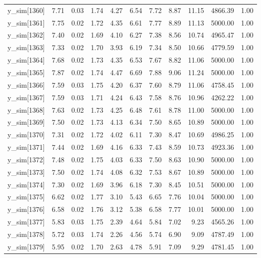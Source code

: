 \begin{table}[ht]
\begin{tabular}{rrrrrrrrrrr}
  y\_sim[1360] & 7.71 & 0.03 & 1.74 & 4.27 & 6.54 & 7.72 & 8.87 & 11.15 & 4866.39 & 1.00 \\ 
  y\_sim[1361] & 7.75 & 0.02 & 1.72 & 4.35 & 6.61 & 7.77 & 8.89 & 11.13 & 5000.00 & 1.00 \\ 
  y\_sim[1362] & 7.40 & 0.02 & 1.69 & 4.10 & 6.27 & 7.38 & 8.56 & 10.74 & 4965.47 & 1.00 \\ 
  y\_sim[1363] & 7.33 & 0.02 & 1.70 & 3.93 & 6.19 & 7.34 & 8.50 & 10.66 & 4779.59 & 1.00 \\ 
  y\_sim[1364] & 7.68 & 0.02 & 1.73 & 4.35 & 6.53 & 7.67 & 8.82 & 11.06 & 5000.00 & 1.00 \\ 
  y\_sim[1365] & 7.87 & 0.02 & 1.74 & 4.47 & 6.69 & 7.88 & 9.06 & 11.24 & 5000.00 & 1.00 \\ 
  y\_sim[1366] & 7.59 & 0.03 & 1.75 & 4.20 & 6.37 & 7.60 & 8.79 & 11.06 & 4758.45 & 1.00 \\ 
  y\_sim[1367] & 7.59 & 0.03 & 1.71 & 4.24 & 6.43 & 7.58 & 8.76 & 10.96 & 4262.22 & 1.00 \\ 
  y\_sim[1368] & 7.63 & 0.02 & 1.73 & 4.25 & 6.48 & 7.61 & 8.78 & 11.00 & 5000.00 & 1.00 \\ 
  y\_sim[1369] & 7.50 & 0.02 & 1.73 & 4.13 & 6.34 & 7.50 & 8.65 & 10.89 & 5000.00 & 1.00 \\ 
  y\_sim[1370] & 7.31 & 0.02 & 1.72 & 4.02 & 6.11 & 7.30 & 8.47 & 10.69 & 4986.25 & 1.00 \\ 
  y\_sim[1371] & 7.44 & 0.02 & 1.69 & 4.16 & 6.33 & 7.43 & 8.59 & 10.73 & 4923.36 & 1.00 \\ 
  y\_sim[1372] & 7.48 & 0.02 & 1.75 & 4.03 & 6.33 & 7.50 & 8.63 & 10.90 & 5000.00 & 1.00 \\ 
  y\_sim[1373] & 7.50 & 0.02 & 1.74 & 4.08 & 6.32 & 7.53 & 8.67 & 10.89 & 5000.00 & 1.00 \\ 
  y\_sim[1374] & 7.30 & 0.02 & 1.69 & 3.96 & 6.18 & 7.30 & 8.45 & 10.51 & 5000.00 & 1.00 \\ 
  y\_sim[1375] & 6.62 & 0.02 & 1.77 & 3.10 & 5.43 & 6.65 & 7.76 & 10.04 & 5000.00 & 1.00 \\ 
  y\_sim[1376] & 6.58 & 0.02 & 1.76 & 3.12 & 5.38 & 6.58 & 7.77 & 10.01 & 5000.00 & 1.00 \\ 
  y\_sim[1377] & 5.83 & 0.03 & 1.75 & 2.39 & 4.64 & 5.84 & 7.02 & 9.23 & 4565.26 & 1.00 \\ 
  y\_sim[1378] & 5.72 & 0.03 & 1.74 & 2.26 & 4.56 & 5.74 & 6.90 & 9.09 & 4787.49 & 1.00 \\ 
  y\_sim[1379] & 5.95 & 0.02 & 1.70 & 2.63 & 4.78 & 5.91 & 7.09 & 9.29 & 4781.45 & 1.00 \\ 

\end{tabular}
\end{table}
